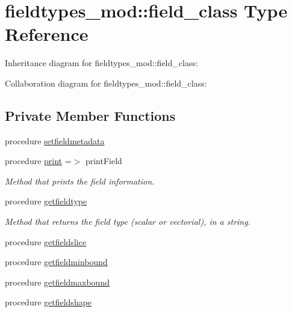 \hypertarget{structfieldtypes__mod_1_1field__class}{}\section{fieldtypes\+\_\+mod\+:\+:field\+\_\+class Type Reference}
\label{structfieldtypes__mod_1_1field__class}


Inheritance diagram for fieldtypes\+\_\+mod\+:\+:field\+\_\+class\+:


Collaboration diagram for fieldtypes\+\_\+mod\+:\+:field\+\_\+class\+:
\subsection*{Private Member Functions}
\begin{DoxyCompactItemize}
\item 
procedure \mbox{\hyperlink{structfieldtypes__mod_1_1field__class_a3dd056d55794122c3358d103e2c56f18}{setfieldmetadata}}
\item 
procedure \mbox{\hyperlink{structfieldtypes__mod_1_1field__class_afaab58efcda61608934254b6b4d85ed5}{print}} =$>$ print\+Field
\begin{DoxyCompactList}\small\item\em Method that prints the field information. \end{DoxyCompactList}\item 
procedure \mbox{\hyperlink{structfieldtypes__mod_1_1field__class_a8474f700cf545721b177e1fc91020fd7}{getfieldtype}}
\begin{DoxyCompactList}\small\item\em Method that returns the field type (scalar or vectorial), in a string. \end{DoxyCompactList}\item 
procedure \mbox{\hyperlink{structfieldtypes__mod_1_1field__class_aea2e4a6d0c0670f91af911f398b92c7a}{getfieldslice}}
\item 
procedure \mbox{\hyperlink{structfieldtypes__mod_1_1field__class_ac649c9d1381497b945ccdb67b84ddd1a}{getfieldminbound}}
\item 
procedure \mbox{\hyperlink{structfieldtypes__mod_1_1field__class_a8275318f997672a2933ff6bbdcffa521}{getfieldmaxbound}}
\item 
procedure \mbox{\hyperlink{structfieldtypes__mod_1_1field__class_a744774bc9ac7ce6b8e2c9e35b8c19a7b}{getfieldshape}}
\end{DoxyCompactItemize}
